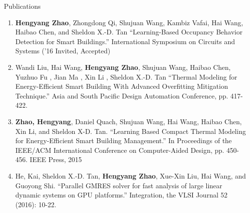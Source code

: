 \documentclass{resume} %
\begin{document}
\begin{rSection}{Publications}

\begin{enumerate}

    \item \textbf{Hengyang Zhao}, Zhongdong Qi, Shujuan Wang, Kambiz Vafai, Hai
        Wang, Haibao Chen, and Sheldon X.-D. Tan ``Learning-Based Occupancy
        Behavior Detection for Smart Buildings.'' International Symposium on
        Circuits and Systems ('16 Invited, Accepted)

    \item Wandi Liu, Hai Wang, \textbf{Hengyang Zhao}, Shujuan Wang, Haibao
        Chen, Yuzhuo Fu , Jian Ma , Xin Li , Sheldon X.-D. Tan ``Thermal
        Modeling for Energy-Efficient Smart Building With Advanced Overfitting
        Mitigation Technique.'' Asia and South Pacific Design Automation
        Conference, pp.  417-422.

    \item \textbf{Zhao, Hengyang}, Daniel Quach, Shujuan Wang, Hai Wang, Haibao
        Chen, Xin Li, and Sheldon X-D. Tan. ``Learning Based Compact Thermal
        Modeling for Energy-Efficient Smart Building Management.'' In
        Proceedings of the IEEE/ACM International Conference on Computer-Aided
        Design, pp.  450-456. IEEE Press, 2015

    \item He, Kai, Sheldon X.-D. Tan, \textbf{Hengyang Zhao}, Xue-Xin Liu, Hai Wang, and
        Guoyong Shi. ``Parallel GMRES solver for fast analysis of large linear
        dynamic systems on GPU platforms.'' Integration, the VLSI Journal 52
        (2016): 10-22.

\end{enumerate}

\end{rSection}
\end{document}
